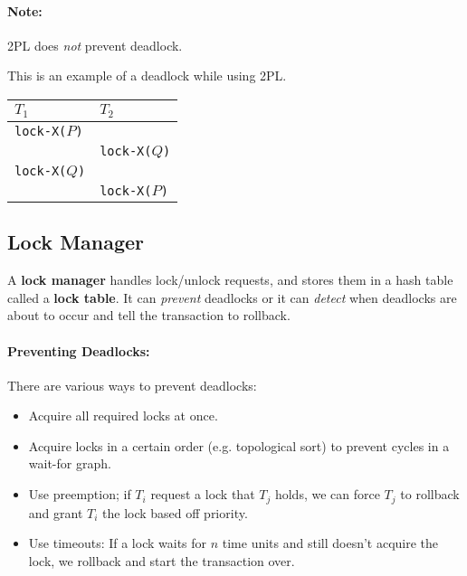 \documentclass{report}
\newenvironment{example}{\begin{tcolorbox}[title={Example},colback=green!5!white,colframe=black!75!green]}{\end{tcolorbox}}
\renewcommand{\bf}[1]{\textbf{{#1}}}
\renewcommand{\tt}[1]{\texttt{{#1}}}
\renewcommand{\it}[1]{\textit{{#1}}}
\begin{document}
\paragraph{Note:} 2PL does \it{not} prevent deadlock.
\begin{example}
    This is an example of a deadlock while using 2PL.

    {
        \centering
        \begin{tabular}{l|l}
            $T_1$ & $T_2$ \\
            \hline
            \tt{lock-X($P$)} & \\
                             & \tt{lock-X($Q$)} \\
            \tt{lock-X($Q$)} & \\
                             & \tt{lock-X($P$)} \\
        \end{tabular}
        \par
    }
\end{example}

\subsection{Lock Manager}
A \bf{lock manager} handles lock/unlock requests, and stores them in a hash
table called a \bf{lock table}. It can \it{prevent} deadlocks or it can
\it{detect} when deadlocks are about to occur and tell the transaction to
rollback.

\paragraph{Preventing Deadlocks:} There are various ways to prevent deadlocks:
\begin{itemize}[label=$\to$]
    \item Acquire all required locks at once.
    \item Acquire locks in a certain order (e.g. topological sort) to prevent
        cycles in a wait-for graph.
    \item Use preemption; if $T_i$ request a lock that $T_j$ holds, we can
        force $T_j$ to rollback and grant $T_i$ the lock based off priority.
    \item Use timeouts: If a lock waits for $n$ time units and still doesn't
        acquire the lock, we rollback and start the transaction over.
\end{itemize}
\end{document}
